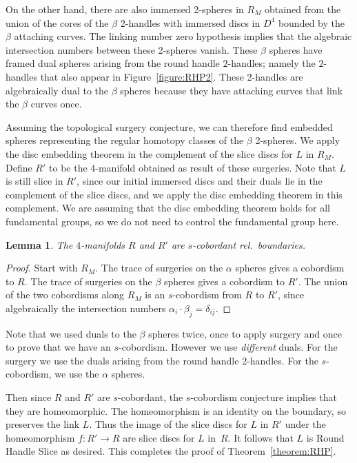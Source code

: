 \documentclass[11pt, oneside]{amsart}
\numberwithin{equation}{section}
\theoremstyle{plain}
\newtheorem{lemma}[equation]{Lemma}
\theoremstyle{definition}
\theoremstyle{remark}
\numberwithin{equation}{section}
\begin{document}
On the other hand, there are also immersed 2-spheres in $R_M$ obtained from the union of the cores of the $\beta$ 2-handles with immersed discs in $D^4$ bounded by the $\beta$ attaching curves.  The linking number zero hypothesis implies that the algebraic intersection numbers between these 2-spheres vanish.
These $\beta$ spheres have framed dual spheres arising from the round handle $2$-handles; namely the $2$-handles that also appear in Figure~\ref{figure:RHP2}.  These 2-handles are algebraically dual to the $\beta$ spheres because they have attaching curves that link the $\beta$ curves once.

    Assuming the topological surgery conjecture, we can therefore find embedded spheres representing the regular homotopy classes of the $\beta$ 2-spheres.  We apply the disc embedding theorem in the complement of the slice discs for $L$ in $R_M$.  Define $R'$ to be the $4$-manifold obtained as result of these surgeries.
Note that $L$ is still slice in $R'$, since our initial immersed discs and their duals lie in the complement of the slice discs, and we apply the disc embedding theorem in this complement.  We are assuming that the disc embedding theorem holds for all fundamental groups, so we do not need to control the fundamental group here.

\begin{lemma}
  The $4$-manifolds $R$ and $R'$ are $s$-cobordant rel.\ boundaries.
\end{lemma}

\begin{proof}
  Start with $R_M$.  The trace of surgeries on the $\alpha$ spheres gives a cobordism to $R$.  The trace of surgeries on the $\beta$ spheres gives a cobordism to $R'$.  The union of the two cobordisms along $R_M$ is an $s$-cobordism from $R$ to $R'$, since algebraically the intersection numbers $\alpha_i \cdot \beta_j = \delta_{ij}$.
\end{proof}

Note that we used duals to the $\beta$ spheres twice, once to apply surgery and once to prove that we have an $s$-cobordism. However we use \emph{different} duals.  For the surgery we use the duals arising from the round handle $2$-handles.  For the $s$-cobordism, we use the $\alpha$ spheres.

Then since $R$ and $R'$ are $s$-cobordant, the $s$-cobordism conjecture implies that they are homeomorphic.  The homeomorphism is an identity on the boundary, so preserves the link $L$.  Thus the image of the slice discs for $L$ in $R'$ under the homeomorphism $f \colon R' \to R$ are slice discs for $L$ in~$R$.  It follows that $L$ is Round Handle Slice as desired.
This completes the proof of Theorem~\ref{theorem:RHP}.




\end{document}
